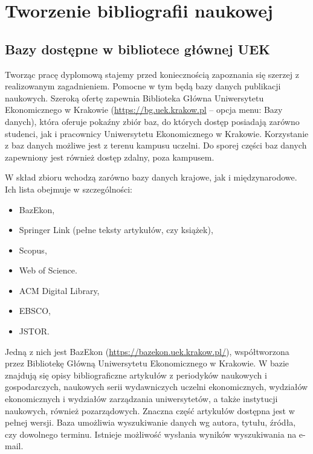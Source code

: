 \chapter{Tworzenie bibliografii naukowej}
\label{chap:czwarty}



\section{Bazy dostępne w bibliotece głównej UEK}

Tworząc pracę dyplomową stajemy przed koniecznością zapoznania się szerzej z realizowanym zagadnieniem. Pomocne w tym będą bazy danych publikacji naukowych. Szeroką ofertę zapewnia Biblioteka Główna Uniwersytetu Ekonomicznego w Krakowie (\url{https://bg.uek.krakow.pl} -- opcja menu: Bazy danych), która oferuje pokaźny zbiór baz, do których dostęp posiadają zarówno studenci, jak i pracownicy Uniwersytetu Ekonomicznego w Krakowie. Korzystanie z baz danych możliwe jest z terenu kampusu uczelni. Do sporej części baz danych zapewniony jest również dostęp zdalny, poza kampusem.

W skład zbioru wchodzą zarówno bazy danych krajowe, jak i międzynarodowe. Ich lista obejmuje w szczególności: 

\begin{itemize}
	\item BazEkon,
	\item Springer Link (pełne teksty artykułów, czy książek),
	\item Scopus,
	\item Web of Science.
	\item ACM Digital Library,
	\item EBSCO,
	\item JSTOR.
\end{itemize}

Jedną z nich jest BazEkon (\url{https://bazekon.uek.krakow.pl/}), współtworzona przez Bibliotekę Główną Uniwersytetu Ekonomicznego w Krakowie. W bazie znajdują się opisy bibliograficzne artykułów z periodyków naukowych i gospodarczych, naukowych serii wydawniczych uczelni ekonomicznych, wydziałów ekonomicznych i wydziałów zarządzania uniwersytetów, a także instytucji naukowych, również pozarządowych. Znaczna część artykułów dostępna jest w pełnej wersji. Baza umożliwia wyszukiwanie danych wg autora, tytułu, źródła, czy dowolnego terminu. Istnieje możliwość wysłania wyników wyszukiwania na e-mail.

